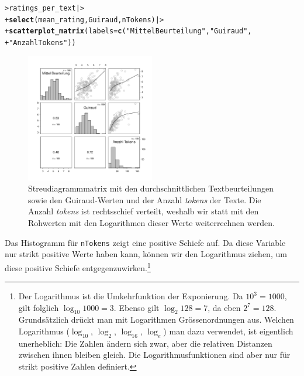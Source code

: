 \documentclass[oneside, 10pt]{book}\usepackage[]{graphicx}\usepackage[]{xcolor}
\makeatletter
\newcommand{\hlstr}[1]{\textcolor[rgb]{0.192,0.494,0.8}{#1}}%
\newcommand{\hlstd}[1]{\textcolor[rgb]{0.345,0.345,0.345}{#1}}%
\newcommand{\hlkwc}[1]{\textcolor[rgb]{0.333,0.667,0.333}{#1}}%
\newcommand{\hlkwd}[1]{\textcolor[rgb]{0.737,0.353,0.396}{\textbf{#1}}}%
\newenvironment{kframe}{%
 \def\at@end@of@kframe{}%
 \ifinner\ifhmode%
  \def\at@end@of@kframe{\end{minipage}}%
  \begin{minipage}{\columnwidth}%
 \fi\fi%
 \def\FrameCommand##1{\hskip\@totalleftmargin \hskip-\fboxsep
 \colorbox{shadecolor}{##1}\hskip-\fboxsep
     \hskip-\linewidth \hskip-\@totalleftmargin \hskip\columnwidth}%
 \MakeFramed {\advance\hsize-\width
   \@totalleftmargin\z@ \linewidth\hsize
   \@setminipage}}%
 {\par\unskip\endMakeFramed%
 \at@end@of@kframe}
\newenvironment{knitrout}{}{} %
\makeatother
\begin{document}
\begin{knitrout}
\color{fgcolor}\begin{kframe}
\begin{alltt}
\hlstd{> }\hlstd{ratings_per_text |>}
\hlstd{+ }  \hlkwd{select}\hlstd{(mean_rating, Guiraud, nTokens) |>}
\hlstd{+ }  \hlkwd{scatterplot_matrix}\hlstd{(}\hlkwc{labels} \hlstd{=} \hlkwd{c}\hlstd{(}\hlstr{"Mittel Beurteilung"}\hlstd{,} \hlstr{"Guiraud"}\hlstd{,}
\hlstd{+ }                                \hlstr{"Anzahl Tokens"}\hlstd{))}
\end{alltt}
\end{kframe}\begin{figure}[tp]

{\centering \includegraphics[width=0.5\textwidth]{figs/unnamed-chunk-332-1} 

}

\caption{Streudiagrammmatrix mit den durchschnittlichen Textbeurteilungen sowie den Guiraud-Werten und der Anzahl \textit{tokens} der Texte. Die Anzahl \textit{tokens} ist rechtsschief verteilt, weshalb wir statt mit den Rohwerten mit den Logarithmen dieser Werte weiterrechnen werden.\label{fig:guiraud}}\label{fig:unnamed-chunk-332}
\end{figure}

\end{knitrout}
Das Histogramm für \texttt{nTokens} zeigt eine positive Schiefe auf.
Da diese Variable nur strikt positive Werte haben kann, können wir
den Logarithmus ziehen, um diese positive Schiefe entgegenzuwirken.\footnote{Der
Logarithmus ist die Umkehrfunktion der Exponierung.
Da $10^3 = 1000$, gilt folglich $\log_{10} 1000 = 3$.
Ebenso gilt $\log_2 128 = 7$, da eben $2^7 = 128$.
Grundsätzlich drückt man mit Logarithmen Grössenordnungen aus.
Welchen Logarithmus ($\log_{10}$, $\log_2$, $\log_{16}$, $\log_e$) man
dazu verwendet, ist eigentlich unerheblich: Die Zahlen ändern
sich zwar, aber die relativen Distanzen zwischen ihnen bleiben gleich.
Die Logarithmusfunktionen sind aber nur für strikt positive Zahlen definiert.}
\end{document}
